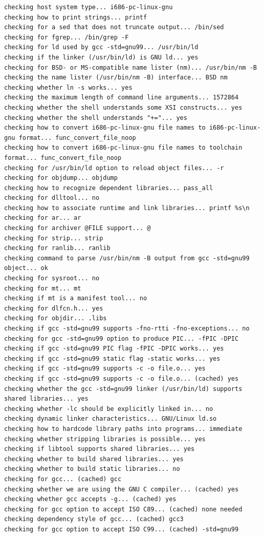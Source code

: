 {\begin{shaded}
\begin{verbatim}
checking host system type... i686-pc-linux-gnu
checking how to print strings... printf
checking for a sed that does not truncate output... /bin/sed
checking for fgrep... /bin/grep -F
checking for ld used by gcc -std=gnu99... /usr/bin/ld
checking if the linker (/usr/bin/ld) is GNU ld... yes
checking for BSD- or MS-compatible name lister (nm)... /usr/bin/nm -B
checking the name lister (/usr/bin/nm -B) interface... BSD nm
checking whether ln -s works... yes
checking the maximum length of command line arguments... 1572864
checking whether the shell understands some XSI constructs... yes
checking whether the shell understands "+="... yes
checking how to convert i686-pc-linux-gnu file names to i686-pc-linux-gnu format... func_convert_file_noop
checking how to convert i686-pc-linux-gnu file names to toolchain format... func_convert_file_noop
checking for /usr/bin/ld option to reload object files... -r
checking for objdump... objdump
checking how to recognize dependent libraries... pass_all
checking for dlltool... no
checking how to associate runtime and link libraries... printf %s\n
checking for ar... ar
checking for archiver @FILE support... @
checking for strip... strip
checking for ranlib... ranlib
checking command to parse /usr/bin/nm -B output from gcc -std=gnu99 object... ok
checking for sysroot... no
checking for mt... mt
checking if mt is a manifest tool... no
checking for dlfcn.h... yes
checking for objdir... .libs
checking if gcc -std=gnu99 supports -fno-rtti -fno-exceptions... no
checking for gcc -std=gnu99 option to produce PIC... -fPIC -DPIC
checking if gcc -std=gnu99 PIC flag -fPIC -DPIC works... yes
checking if gcc -std=gnu99 static flag -static works... yes
checking if gcc -std=gnu99 supports -c -o file.o... yes
checking if gcc -std=gnu99 supports -c -o file.o... (cached) yes
checking whether the gcc -std=gnu99 linker (/usr/bin/ld) supports shared libraries... yes
checking whether -lc should be explicitly linked in... no
checking dynamic linker characteristics... GNU/Linux ld.so
checking how to hardcode library paths into programs... immediate
checking whether stripping libraries is possible... yes
checking if libtool supports shared libraries... yes
checking whether to build shared libraries... yes
checking whether to build static libraries... no
checking for gcc... (cached) gcc
checking whether we are using the GNU C compiler... (cached) yes
checking whether gcc accepts -g... (cached) yes
checking for gcc option to accept ISO C89... (cached) none needed
checking dependency style of gcc... (cached) gcc3
checking for gcc option to accept ISO C99... (cached) -std=gnu99

\end{verbatim}
\end{shaded}}
